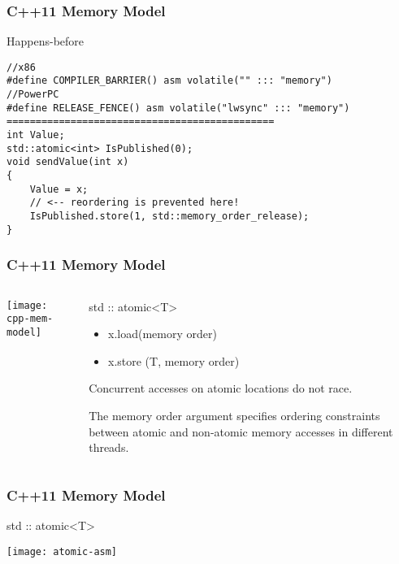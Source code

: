 \begin{frame}[fragile]
    \frametitle{C++11 Memory Model}
    \LARGE
    Happens-before
    \large    
    \begin{block}{}
        \begin{verbatim}
//x86
#define COMPILER_BARRIER() asm volatile("" ::: "memory") 
//PowerPC
#define RELEASE_FENCE() asm volatile("lwsync" ::: "memory") 
==============================================
int Value;
std::atomic<int> IsPublished(0);
void sendValue(int x)
{
    Value = x;
    // <-- reordering is prevented here!
    IsPublished.store(1, std::memory_order_release);
}
\end{verbatim}
    \end{block}
    
\end{frame}
\begin{frame}
    \frametitle{C++11 Memory Model}
    
    
    \begin{columns}
        
        \begin{column}{.4\textwidth}
            \texttt{[image: cpp-mem-model]}
        \end{column}
        \begin{column}{.6\textwidth}
            
            \Large
            std :: atomic<T>

            \begin{itemize}
                \item x.load(memory order)
                \item x.store (T, memory order)
                
            \end{itemize}
         \normalsize
        Concurrent accesses on atomic locations do not race.
        
        The memory order argument specifies ordering constraints between
        atomic and non-atomic memory accesses in different threads.
                    
        \end{column}
    \end{columns}
    
\end{frame}


\begin{frame}
    \frametitle{C++11 Memory Model}
    \LARGE
    std :: atomic<T>
    
    \texttt{[image: atomic-asm]}
\end{frame}

